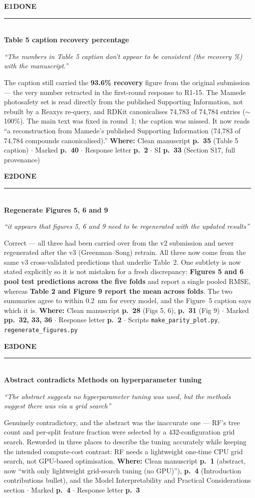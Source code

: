 \documentclass[11pt]{article}
\newcommand{\itemhead}[4]{%
  \needspace{4\baselineskip}%
  \vspace{0.5em}%
  {\bfseries\color{accent}#1}\hfill{\small\bfseries\color{#3}\MakeUppercase{#2}}\\[-0.4em]
  \textcolor{rulegrey}{\rule{\linewidth}{0.4pt}}\\[-0.2em]
  {\bfseries #4}\par\vspace{-0.15em}%
}
\newcommand{\quo}[1]{{\small\itshape\color{inkmute}``#1''}\par}
\newcommand{\where}[1]{%
  \vspace{0.15em}%
  {\small\textcolor{inkmute}{\textbf{Where:}} #1}\par
}
\begin{document}
\itemhead{E1}{done}{done}{Table 5 caption recovery percentage}
\quo{The numbers in Table 5 caption don't appear to be consistent (the recovery \%) with the manuscript.}
The caption still carried the \textbf{93.6\% recovery} figure from the original submission --- the very
number retracted in the first-round response to R1-15. The Mamede photosafety set is read directly from
the published Supporting Information, not rebuilt by a Reaxys re-query, and RDKit canonicalises 74{,}783
of 74{,}784 entries ($\sim$100\%). The main text was fixed in round~1; the caption was missed. It now reads
``a reconstruction from Mamede's published Supporting Information (74{,}783 of 74{,}784 compounds
canonicalised).''
\where{Clean manuscript \textbf{p.~35} (Table 5 caption) $\cdot$ Marked \textbf{p.~40} $\cdot$
Response letter \textbf{p.~2} $\cdot$ SI \textbf{p.~33} (Section S17, full provenance)}

\itemhead{E2}{done}{done}{Regenerate Figures 5, 6 and 9}
\quo{it appears that figures 5, 6 and 9 need to be regenerated with the updated results}
Correct --- all three had been carried over from the v2 submission and never regenerated after the v3
(Greenman--Song) retrain. All three now come from the same v3 cross-validated predictions that underlie
Table~2. One subtlety is now stated explicitly so it is not mistaken for a fresh discrepancy:
\textbf{Figures 5 and 6 pool test predictions across the five folds} and report a single pooled RMSE,
whereas \textbf{Table 2 and Figure 9 report the mean across folds}. The two summaries agree to within
0.2~nm for every model, and the Figure~5 caption says which it is.
\where{Clean manuscript \textbf{p.~28} (Figs 5, 6), \textbf{p.~31} (Fig 9) $\cdot$ Marked
\textbf{pp.~32, 33, 36} $\cdot$ Response letter \textbf{p.~2} $\cdot$ Scripts
\texttt{make\_parity\_plot.py}, \texttt{regenerate\_figures.py}}

\itemhead{E3}{done}{done}{Abstract contradicts Methods on hyperparameter tuning}
\quo{The abstract suggests no hyperparameter tuning was used, but the methods suggest there was via a grid search}
Genuinely contradictory, and the abstract was the inaccurate one --- RF's tree count and per-split feature
fraction were selected by a 432-configuration grid search. Reworded in three places to describe the tuning
accurately while keeping the intended compute-cost contrast: RF needs a lightweight one-time CPU grid
search, not GPU-based optimisation.
\where{Clean manuscript \textbf{p.~1} (abstract, now ``with only lightweight grid-search tuning (no GPU)''),
\textbf{p.~4} (Introduction contributions bullet), and the Model Interpretability and Practical
Considerations section $\cdot$ Marked \textbf{p.~4} $\cdot$ Response letter \textbf{p.~3}}
\end{document}
